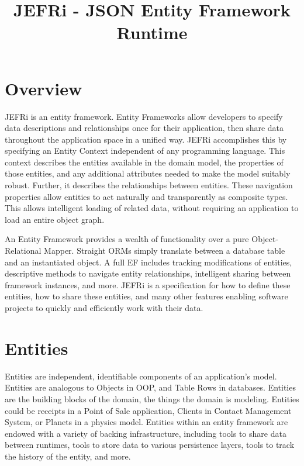 \documentclass{article}
\begin{document}
\title{JEFRi - JSON Entity Framework Runtime}
\maketitle
\tableofcontents
\newpage
\linespread{1.6}

\section{Overview}

JEFRi is an entity framework. Entity Frameworks allow developers to specify
data descriptions and relationships once for their application, then share data throughout
the application space in a unified way. JEFRi accomplishes this by specifying
an Entity Context independent of any programming language. This context
describes the entities available in the domain model, the properties of those
entities, and any additional attributes needed to make the model suitably
robust. Further, it describes the relationships between entities. These
navigation properties allow entities to act naturally and transparently as
composite types. This allows intelligent loading of related data, without
requiring an application to load an entire object graph.

An Entity Framework provides a wealth of functionality over a pure
Object-Relational Mapper. Straight ORMs simply translate between a database
table and an instantiated object. A full EF includes tracking modifications
of entities, descriptive methods to navigate entity relationships, intelligent
sharing between framework instances, and more. JEFRi is a specification for how
to define these entities, how to share these entities, and many other features
enabling software projects to quickly and efficiently work with their data.


\section{Entities}

Entities are independent, identifiable components of an application's model.
Entities are analogous to Objects in OOP, and Table Rows in databases. Entities
are the building blocks of the domain, the things the domain is modeling.
Entities could be receipts in a Point of Sale application, Clients in Contact
Management System, or Planets in a physics model. Entities within an entity
framework are endowed with a variety of backing infrastructure, including tools
to share data between runtimes, tools to store data to various persistence
layers, tools to track the history of the entity, and more.
\end{document}
